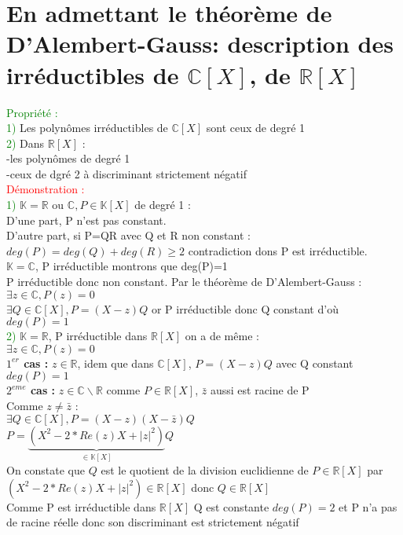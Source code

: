 \documentclass{article}
\begin{document}
\section{En admettant le théorème de D'Alembert-Gauss: description des irréductibles de $\mathbb C [X]$, de $\mathbb R[X]$}
\textcolor{green}{Propriété :} \\
\textcolor{green}{1)} Les polynômes irréductibles de $\mathbb C [X]$ sont ceux de degré 1 \\
\textcolor{green}{2)} Dans $\mathbb R [X]$ : \\
 \indent -les polynômes de degré 1 \\
 \indent -ceux de dgré 2 à discriminant strictement négatif \\
 \textcolor{red}{Démonstration :} \\
\textcolor{green}{1)} $\mathbb  K = \mathbb{R}$ ou $\mathbb{C}, P \in \mathbb K[X]$ de degré 1 : \\
D'une part, P n'est pas constant. \\
D'autre part, si P=QR avec Q et R non constant : $deg(P)=deg(Q)+deg(R) \geq 2$ contradiction dons P est irréductible. \\
$\mathbb{K}= \mathbb C$, P irréductible montrons que deg(P)=1 \\
P irréductible donc non constant. Par le théorème de D'Alembert-Gauss : $\exists z \in \mathbb C, P(z)=0$ \\
$\exists Q \in \mathbb C [X], P=(X-z)Q$ or P irréductible donc Q constant d'où $deg(P)=1$ \\
\textcolor{green}{2)} $\mathbb K= \mathbb R$, P irréductible dans $ \mathbb R [X]$ on a de  même : \\
$\exists z \in \mathbb C, P(z)=0$ \\
{\bf $1^{er}$ cas :} $z\in \mathbb R$, idem que dans $\mathbb C[X]$, $P=(X-z)Q$ avec Q constant $deg(P)=1$ \\
{\bf $2^{eme}$ cas :} $z \in \mathbb C \backslash \mathbb R $ comme $P \in \mathbb R [X]$, $\bar{z}$ aussi est racine de P \\
Comme $z \neq \bar{z}$ : \\
$\exists Q \in \mathbb C [X],P=(X-z)(X-\bar{z})Q$ \\
$P=\underbrace{(X^2-2*Re(z)X+|z|^2)}_{\in \mathbb K [X]}Q$ \\
On constate que $Q$ est le quotient de la division euclidienne de $P \in \mathbb{R}[X]$ par $(X^2-2*Re(z)X+|z|^2) \in \mathbb R [X]$ donc $Q \in \mathbb{R}[X]$ \\
Comme P est irréductible dans $\mathbb{R}[X]$ Q est constante $deg(P)=2$ et P n'a pas de racine réelle donc son discriminant est strictement négatif
\end{document}
